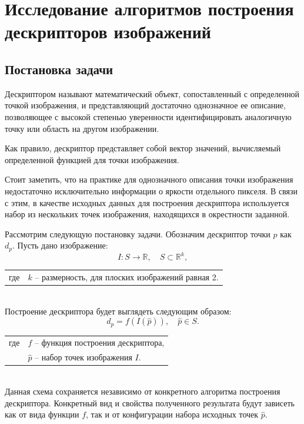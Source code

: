 \section{Исследование алгоритмов построения дескрипторов изображений}
{
\subsection{Постановка задачи}{
	Дескриптором называют математический объект, сопоставленный с определенной точкой изображения, и представляющий достаточно однозначное ее описание, позволяющее с высокой степенью уверенности идентифицировать аналогичную точку или область на другом изображении. 
	
	Как правило, дескриптор представляет собой вектор значений, вычисляемый определенной функцией для точки изображения.
	
	Стоит заметить, что на практике для однозначного описания точки изображения недостаточно исключительно информации о яркости отдельного пикселя. В связи с этим, в качестве исходных данных для построения дескриптора используется набор из нескольких точек изображения, находящихся в окрестности заданной.  
	
	Рассмотрим следующую постановку задачи.
	Обозначим дескриптор точки $p$ как $d_p$.
	Пусть дано изображение:
	\begin{equation}\label{problem_images}
	I : S \rightarrow \mathbb{R}, \quad S \subset \mathbb{R}^k,
	\end{equation}
	   	\begin{tabular}{ rl }
	  	 \quad \quad где 
	   	& $k$ -- размерность, для плоских изображений равная 2.
	   	\end{tabular}\\
   
	Построение дескриптора будет выглядеть следующим образом:
	\begin{equation}\label{problem_transform}
	d_p = f(I(\hat{p})), \quad \hat{p} \in S.
	\end{equation} 
	   	\begin{tabular}{ rl }
	   	\quad \quad где 
	   	& $f$ -- функция построения дескриптора, \\
	   	& $\hat{p}$ -- набор точек изображения $I$.
	\end{tabular}\\

	Данная схема сохраняется независимо от конкретного алгоритма построения дескриптора. Конкретный вид и свойства полученного результата будут зависеть как от вида функции $f$, так и от конфигурации набора исходных точек $\hat{p}$.
 
}}
